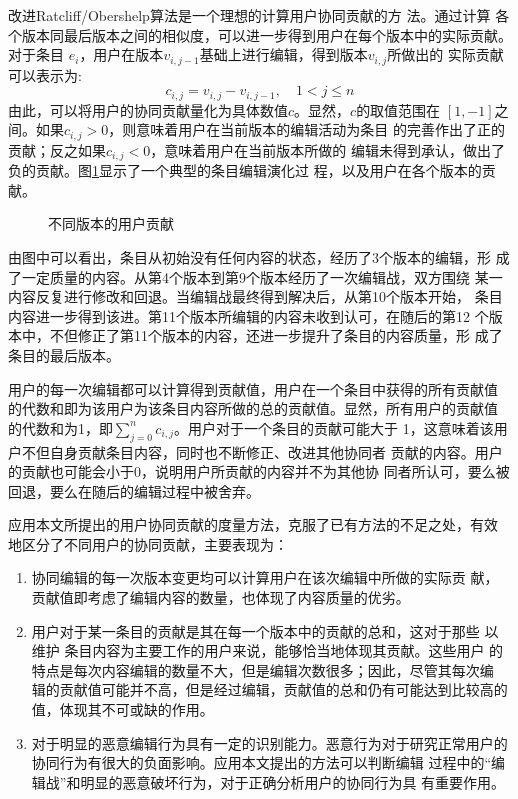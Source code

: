 改进Ratcliff/Obershelp算法是一个理想的计算用户协同贡献的方
法。通过计算
各个版本同最后版本之间的相似度，可以进一步得到用户在每个版本中的实际贡献。对于条目
$e_i$，用户在版本$v_{i,j-1}$基础上进行编辑，得到版本$v_{i,j}$所做出的
实际贡献可以表示为:
\[
c_{i,j}=v_{i,j}-v_{i,j-1}, \quad 1<j \leq n
\]
由此，可以将用户的协同贡献量化为具体数值$c$。显然，$c$的取值范围在
$[1,-1]$之间。如果$c_{i,j}>0$，则意味着用户在当前版本的编辑活动为条目
的完善作出了正的贡献；反之如果$c_{i,j}<0$，意味着用户在当前版本所做的
编辑未得到承认，做出了负的贡献。图\ref{fig:contribution}显示了一个典型的条目编辑演化过
程，以及用户在各个版本的贡献。
\begin{figure}[htp]
  \centering
 
  \caption{不同版本的用户贡献}
  \label{fig:contribution}
\end{figure}

由图中可以看出，条目从初始没有任何内容的状态，经历了3个版本的编辑，形
成了一定质量的内容。从第4个版本到第9个版本经历了一次编辑战，双方围绕
某一内容反复进行修改和回退。当编辑战最终得到解决后，从第10个版本开始，
条目内容进一步得到该进。第11个版本所编辑的内容未收到认可，在随后的第12
个版本中，不但修正了第11个版本的内容，还进一步提升了条目的内容质量，形
成了条目的最后版本。

用户的每一次编辑都可以计算得到贡献值，用户在一个条目中获得的所有贡献值
的代数和即为该用户为该条目内容所做的总的贡献值。显然，所有用户的贡献值
的代数和为1，即$\sum_{j=0}^{n}c_{i,j}$。用户对于一个条目的贡献可能大于
1，这意味着该用户不但自身贡献条目内容，同时也不断修正、改进其他协同者
贡献的内容。用户的贡献也可能会小于0，说明用户所贡献的内容并不为其他协
同者所认可，要么被回退，要么在随后的编辑过程中被舍弃。

应用本文所提出的用户协同贡献的度量方法，克服了已有方法的不足之处，有效
地区分了不同用户的协同贡献，主要表现为：
\begin{enumerate}
\item 协同编辑的每一次版本变更均可以计算用户在该次编辑中所做的实际贡
  献，贡献值即考虑了编辑内容的数量，也体现了内容质量的优劣。 
\item 用户对于某一条目的贡献是其在每一个版本中的贡献的总和，这对于那些
  以维护 条目内容为主要工作的用户来说，能够恰当地体现其贡献。这些用户
  的特点是每次内容编辑的数量不大，但是编辑次数很多；因此，尽管其每次编
  辑的贡献值可能并不高，但是经过编辑，贡献值的总和仍有可能达到比较高的
  值，体现其不可或缺的作用。
\item 对于明显的恶意编辑行为具有一定的识别能力。恶意行为对于研究正常用户的
  协同行为有很大的负面影响。应用本文提出的方法可以判断编辑
  过程中的“编辑战”和明显的恶意破坏行为，对于正确分析用户的协同行为具
  有重要作用。
\end{enumerate}
 
